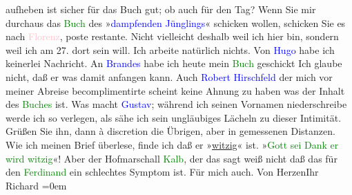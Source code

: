                aufheben ist sicher für das Buch gut; ob auch für den Tag? Wenn Sie mir durchaus das
                  \textcolor{green}{Buch}{} des »\textcolor{blue}{dampfenden Jünglings}{}« schicken wollen, schicken
               Sie es nach \textcolor{pink}{Florenz}{}\ledrightnote{\textcolor{pink}{Florenz}}, poste {\pb}restante. Nicht vielleicht deshalb
               weil ich hier bin, sondern weil ich am 27. dort sein will.\pend
           \pstart
           Ich arbeite natürlich nichts. Von \textcolor{blue}{Hugo}{}\ledrightnote{\textcolor{blue}{Hugo von Hofmannsthal}} habe ich
               keinerlei Nachricht. An \textcolor{blue}{Brandes}{}\ledrightnote{\textcolor{blue}{Georg Brandes}} habe ich heute
               mein \textcolor{green}{Buch}{} geschickt Ich glaube nicht, daß er was damit anfangen kann. Auch \textcolor{blue}{Robert Hirschfeld}{}\ledrightnote{\textcolor{blue}{Robert Hirschfeld}} der mich vor meiner Abreise
               becomplimentirte scheint keine Ahnung zu haben was der Inhalt des \textcolor{green}{Buches}{} ist. Was macht \textcolor{blue}{Gustav}{}\ledrightnote{\textcolor{blue}{Gustav Schwarzkopf}}; während ich seinen Vornamen niederschreibe werde ich so
               verlegen, als sähe ich sein ungläubiges Lächeln zu dieser Intimität. Grüßen Sie ihn,
               dann à discretion die Übrigen, aber in gemessenen Distanzen.\pend
           \pstart
           Wie ich meinen Brief überlese, finde ich daß er »\uline{witzig}« ist. »\textcolor{green}{Gott sei Dank er wird witzig}{}«! Aber der
               Hofmarschall \textcolor{green}{Kalb}{}, der das sagt
               weiß nicht daß das für den \textcolor{green}{Ferdinand}{} ein schlechtes Symptom ist. Für mich auch.\pend
           \pstart
           Von Herzen\hspace*{1.5em}Ihr{\\[\baselineskip]}\spacefill\mbox{Richard}\pend
           \leftskip=0em{}\endnumbering{}  
      